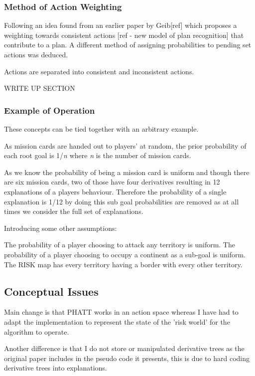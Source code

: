 \documentclass[parskip]{cs4rep}
\begin{document}
\subsubsection{Method of Action Weighting}

Following an idea found from an earlier paper by Geib[ref] which proposes a weighting towards consistent actions [ref - new model of plan recognition] that contribute to a plan. A different method of assigning probabilities to pending set actions was deduced.

Actions are separated into consistent and inconsistent actions. 

WRITE UP SECTION

\subsubsection{Example of Operation}

These concepts can be tied together with an arbitrary example.

As mission cards are handed out to players' at random, the prior probability of each root goal is 1/\textit{n} where \textit{n} is the number of mission cards.

As we know the probability of being a mission card is uniform and though there are six mission cards, two of those have four derivatives resulting in 12 explanations of a players behaviour. Therefore the probability of a single explanation is 1/12 by doing this sub goal probabilities are removed as at all times we consider the full set of explanations.

Introducing some other assumptions:

The probability of a player choosing to attack any territory is uniform.
The probability of a player choosing to occupy a continent as a sub-goal is uniform.
The RISK map has every territory having a border with every other territory.

\subsection{Conceptual Issues}

Main change is that PHATT works in an action space whereas I have had to adapt the implementation to represent the state of the 'risk world' for the algorithm to operate.

Another difference is that I do not store or manipulated derivative trees as the original paper includes in the pseudo code it presents, this is due to hard coding derivative trees into explanations.
\end{document}
